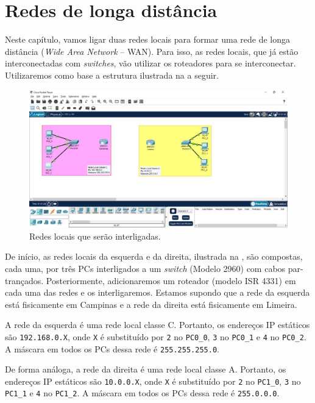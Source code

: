 \chapter{Redes de longa distância}\label{chp:roteamento}
Neste capítulo, vamos ligar duas redes locais para formar uma rede de longa distância (\textit{Wide Area Network} -- WAN). Para isso, as redes locais, que já estão interconectadas com \textit{switches}, vão utilizar os roteadores para se interconectar. Utilizaremos como base a estrutura ilustrada na  a seguir.

\begin{figure}[!hbt]
    \centering
    \includegraphics[width=.99\textwidth]{Figuras/InterRedesLocais}
    \caption{Redes locais que serão interligadas.}\label{fig:roteamentoInicio}
\end{figure}

De início, as redes locais da esquerda e da direita, ilustrada na , são compostas, cada uma, por três PCs interligados a um \textit{switch} (Modelo 2960) com cabos par-trançados. Posteriormente, adicionaremos um roteador (modelo ISR 4331) em cada uma das redes e os interligaremos. Estamos supondo que a rede da esquerda está fisicamente em Campinas e a rede da direita está fisicamente em Limeira.

A rede da esquerda é uma rede local classe C. Portanto, os endereços IP estáticos são \texttt{192.168.0.X}, onde \texttt{X} é substituído por \texttt{2} no \texttt{PC0\_0}, \texttt{3} no \texttt{PC0\_1} e \texttt{4} no \texttt{PC0\_2}. A máscara em todos os PCs dessa rede é \texttt{255.255.255.0}. 

De forma análoga, a  rede da direita é uma rede local classe A. Portanto, os endereços IP estáticos são \texttt{10.0.0.X}, onde \texttt{X} é substituído por \texttt{2} no \texttt{PC1\_0}, \texttt{3} no \texttt{PC1\_1} e \texttt{4} no \texttt{PC1\_2}. A máscara em todos os PCs dessa rede é \texttt{255.0.0.0}. 

